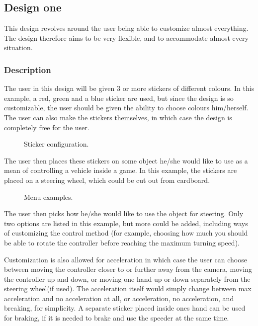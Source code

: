 \subsection{Design one}
This design revolves around the user being able to customize almost everything. The design therefore aims to be very flexible, and to accommodate almost every situation.

\subsubsection*{Description}
The user in this design will be given 3 or more stickers of different colours. In this example, a red, green and a blue sticker are used, but since the design is so customizable, the user should be given the ability to choose colours him/herself. The user can also make the stickers themselves, in which case the design is completely free for the user.

\begin{figure}[h]
\centering
{}
\caption{Sticker configuration.}
\end{figure}

The user then places these stickers on some object he/she would like to use as a mean of controlling a vehicle inside a game. In this example, the stickers are placed on a steering wheel, which could be cut out from cardboard.

\begin{figure}[h]
\centering
{}
\caption{Menu examples.}
\end{figure}

The user then picks how he/she would like to use the object for steering. Only two options are listed in this example, but more could be added, including ways of customizing the control method (for example, choosing how much you should be able to rotate the controller before reaching the maximum turning speed).
\bigskip

Customization is also allowed for acceleration in which case the user can choose between moving the controller closer to or further away from the camera, moving the controller up and down, or moving one hand up or down separately from the steering wheel(if used). The acceleration itself would simply change between max acceleration and no acceleration at all, or acceleration, no acceleration, and breaking, for simplicity. A separate sticker placed inside ones hand can be used for braking, if it is needed to brake and use the speeder at the same time.
\bigskip

